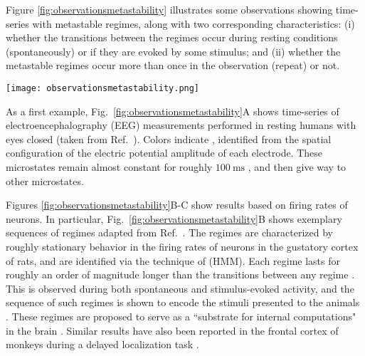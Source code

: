 Figure \ref{fig:observationsmetastability} illustrates some observations showing time-series with metastable regimes, along with two corresponding characteristics: (i) whether the transitions between the regimes occur during resting conditions (spontaneously) or if they are evoked by some stimulus; and (ii) whether the metastable regimes occur more than once in the observation (repeat) or not.  
%
\begin{figure*}[hbt]
    \centering
    \texttt{[image: observationsmetastability.png]}
    \caption{\textbf{Brain activity typically evolves as a sequence of well-defined regimes that are transient but long lived.} The panels illustrate observations taken from the literature, namely EEG microstates \cite{michel2017eeg} (A), firing rate states identified via hidden-Markov-modelling (HMM) \cite{brinkman2022metastable} (B), UP and DOWN states \cite{jercog2017updown} (C), cortical wave patterns \cite{townsend2015emergence} (D), seizure-like activity \cite{wenzel2019acute} (E), and bursting in central pattern generators \cite{sakurai2016recruitment} (F). Each observation is explained in detail in the main text, and is classified into subtypes of metastability that we define in the Sec.~\ref{sec:subtypes}. }
    \label{fig:observationsmetastability}
\end{figure*}

As a first example, Fig.~\ref{fig:observationsmetastability}A shows time-series of electroencephalography (EEG) measurements performed in resting humans with eyes closed (taken from Ref.~\cite{michel2017eeg}). Colors indicate , identified from the spatial configuration of the electric potential amplitude of each electrode. These microstates remain almost constant for roughly $\SI{100}{\milli\second}$ \cite{vandeville2010eeg, lehmann1987eeg}, and then give way to other microstates.

Figures \ref{fig:observationsmetastability}B-C show results based on firing rates of neurons. In particular, Fig.~\ref{fig:observationsmetastability}B shows exemplary sequences of regimes adapted from Ref.~\cite{brinkman2022metastable}. The regimes are characterized by roughly stationary behavior in the firing rates of neurons in the gustatory cortex of rats, and are identified via the technique of  (HMM). Each regime lasts for roughly an order of magnitude longer than the transitions between any regime \cite{jones2007natural, lacamera2019cortical, mazzucato2019expectation, recanatesi2021metastable, brinkman2022metastable}. This is observed during both spontaneous and stimulus-evoked activity, and the sequence of such regimes is shown to encode the stimuli presented to the animals \cite{lacamera2019cortical, mazzucato2019expectation}. These regimes are proposed to serve as a ``substrate for internal computations" in the brain \cite{lacamera2019cortical}. Similar results have also been reported in the frontal cortex of monkeys during a delayed localization task \cite{abeles1995cortical, seidemann1996simultaneously}.

